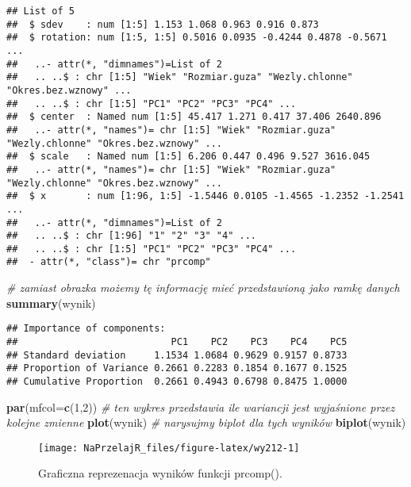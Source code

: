 \documentclass[polish,]{book}
\newenvironment{Shaded}{\begin{snugshade}}{\end{snugshade}}
\newcommand{\CommentTok}[1]{\textcolor[rgb]{0.56,0.35,0.01}{\textit{#1}}}
\newcommand{\DataTypeTok}[1]{\textcolor[rgb]{0.13,0.29,0.53}{#1}}
\newcommand{\DecValTok}[1]{\textcolor[rgb]{0.00,0.00,0.81}{#1}}
\newcommand{\KeywordTok}[1]{\textcolor[rgb]{0.13,0.29,0.53}{\textbf{#1}}}
\newcommand{\NormalTok}[1]{#1}
\begin{document}
\begin{verbatim}
## List of 5
##  $ sdev    : num [1:5] 1.153 1.068 0.963 0.916 0.873
##  $ rotation: num [1:5, 1:5] 0.5016 0.0935 -0.4244 0.4878 -0.5671 ...
##   ..- attr(*, "dimnames")=List of 2
##   .. ..$ : chr [1:5] "Wiek" "Rozmiar.guza" "Wezly.chlonne" "Okres.bez.wznowy" ...
##   .. ..$ : chr [1:5] "PC1" "PC2" "PC3" "PC4" ...
##  $ center  : Named num [1:5] 45.417 1.271 0.417 37.406 2640.896
##   ..- attr(*, "names")= chr [1:5] "Wiek" "Rozmiar.guza" "Wezly.chlonne" "Okres.bez.wznowy" ...
##  $ scale   : Named num [1:5] 6.206 0.447 0.496 9.527 3616.045
##   ..- attr(*, "names")= chr [1:5] "Wiek" "Rozmiar.guza" "Wezly.chlonne" "Okres.bez.wznowy" ...
##  $ x       : num [1:96, 1:5] -1.5446 0.0105 -1.4565 -1.2352 -1.2541 ...
##   ..- attr(*, "dimnames")=List of 2
##   .. ..$ : chr [1:96] "1" "2" "3" "4" ...
##   .. ..$ : chr [1:5] "PC1" "PC2" "PC3" "PC4" ...
##  - attr(*, "class")= chr "prcomp"
\end{verbatim}

\begin{Shaded}
\begin{Highlighting}[]
\CommentTok{# zamiast obrazka możemy tę informację mieć przedstawioną jako ramkę danych}
\KeywordTok{summary}\NormalTok{(wynik)}
\end{Highlighting}
\end{Shaded}

\begin{verbatim}
## Importance of components:
##                           PC1    PC2    PC3    PC4    PC5
## Standard deviation     1.1534 1.0684 0.9629 0.9157 0.8733
## Proportion of Variance 0.2661 0.2283 0.1854 0.1677 0.1525
## Cumulative Proportion  0.2661 0.4943 0.6798 0.8475 1.0000
\end{verbatim}

\begin{Shaded}
\begin{Highlighting}[]
\KeywordTok{par}\NormalTok{(}\DataTypeTok{mfcol=}\KeywordTok{c}\NormalTok{(}\DecValTok{1}\NormalTok{,}\DecValTok{2}\NormalTok{))}
\CommentTok{# ten wykres przedstawia ile wariancji jest wyjaśnione przez kolejne zmienne}
\KeywordTok{plot}\NormalTok{(wynik)}
\CommentTok{# narysujmy biplot dla tych wyników}
\KeywordTok{biplot}\NormalTok{(wynik)}
\end{Highlighting}
\end{Shaded}

\begin{figure}[h]

{\centering \texttt{[image: NaPrzelajR\_files/figure-latex/wy212-1]} 

}

\caption{Graficzna reprezenacja wyników funkcji prcomp().}\label{fig:wy212}
\end{figure}
\end{document}

